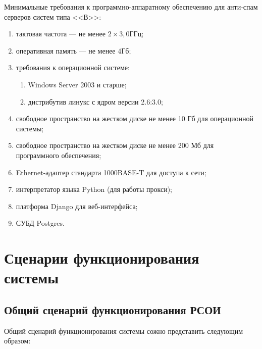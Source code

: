 Минимальные требования к программно-аппаратному обеспечению для анти-спам серверов систем типа <<В>>:

\begin{enumerate}
	\item тактовая частота  --- не менее $2\times3,0 \text{ГГц}$; 
	\item оперативная память --- не менее $4 \text{Гб}$;
	\item требования к операционной системе:
	\begin{enumerate}
		\item Windows Server 2003 и старше;
		\item дистрибутив линукс с ядром версии 2.6:3.0;
	\end{enumerate}
	\item свободное пространство на жестком диске не менее 10 Гб для операционной системы;
	\item свободное пространство на жестком диске не менее 200 Мб для программного обеспечения;
	\item Ethernet-адаптер стандарта 1000BASE-T для доступа к сети;
	\item интерпретатор языка Python (для работы прокси);
	\item платформа Django для веб-интерфейса;
	\item СУБД Postgres.
\end{enumerate}

\section{Сценарии функционирования системы}
\subsection{Общий сценарий функционирования РСОИ}
Общий сценарий функционирования системы сожно представить следующим образом:

